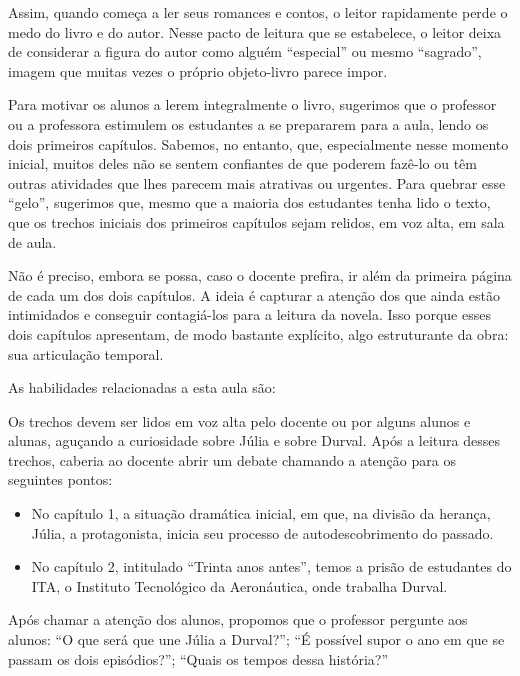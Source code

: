\documentclass[12pt]{extarticle}
\begin{document}
Assim, quando começa a ler seus romances e contos, o leitor rapidamente
perde o medo do livro e do autor. Nesse pacto de leitura que se
estabelece, o leitor deixa de considerar a figura do autor como alguém
``especial'' ou mesmo ``sagrado'', imagem que muitas vezes o próprio
objeto-livro parece impor.

Para motivar os alunos a lerem integralmente o livro, sugerimos que o
professor ou a professora estimulem os estudantes a se prepararem para a
aula, lendo os dois primeiros capítulos. Sabemos, no entanto, que,
especialmente nesse momento inicial, muitos deles não se sentem
confiantes de que poderem fazê-lo ou têm outras atividades que lhes
parecem mais atrativas ou urgentes. Para quebrar esse ``gelo'',
sugerimos que, mesmo que a maioria dos estudantes tenha lido o texto,
que os trechos iniciais dos primeiros capítulos sejam relidos, em voz
alta, em sala de aula.

Não é preciso, embora se possa, caso o docente prefira, ir além da
primeira página de cada um dos dois capítulos. A ideia é capturar a
atenção dos que ainda estão intimidados e conseguir contagiá-los para a
leitura da novela. Isso porque esses dois capítulos apresentam, de modo
bastante explícito, algo estruturante da obra: sua articulação temporal.

As habilidades relacionadas a esta aula são:


Os trechos devem ser lidos em voz alta pelo docente ou por alguns alunos
e alunas, aguçando a curiosidade sobre Júlia e sobre Durval. Após a
leitura desses trechos, caberia ao docente abrir um debate chamando a
atenção para os seguintes pontos:

\begin{itemize}
\item No capítulo 1, a situação dramática inicial, em que, na divisão da
  herança, Júlia, a protagonista, inicia seu processo de
  autodescobrimento do passado.
  
\item No capítulo 2, intitulado ``Trinta anos antes'', temos a prisão de
  estudantes do ITA, o Instituto Tecnológico da Aeronáutica, onde
  trabalha Durval.
\end{itemize}

Após chamar a atenção dos alunos, propomos que o professor pergunte aos
alunos: ``O que será que une Júlia a Durval?''; ``É possível supor o ano
em que se passam os dois episódios?''; ``Quais os tempos dessa
história?''
\end{document}
